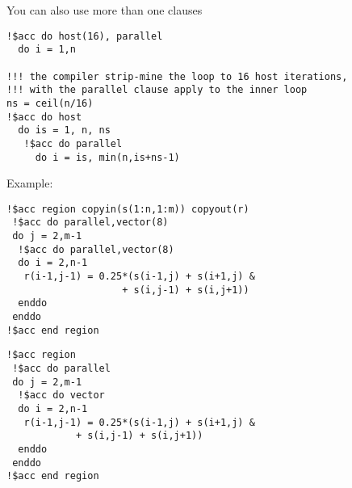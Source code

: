 You can also use more than one clauses
\begin{lstlisting}
!$acc do host(16), parallel 
  do i = 1,n

!!! the compiler strip-mine the loop to 16 host iterations, 
!!! with the parallel clause apply to the inner loop
ns = ceil(n/16) 
!$acc do host 
  do is = 1, n, ns 
   !$acc do parallel 
     do i = is, min(n,is+ns-1)
\end{lstlisting}

Example:
\begin{lstlisting}
!$acc region copyin(s(1:n,1:m)) copyout(r)
 !$acc do parallel,vector(8)
 do j = 2,m-1
  !$acc do parallel,vector(8)
  do i = 2,n-1
   r(i-1,j-1) = 0.25*(s(i-1,j) + s(i+1,j) & 
                    + s(i,j-1) + s(i,j+1))
  enddo
 enddo
!$acc end region
\end{lstlisting}

\begin{lstlisting}
!$acc region
 !$acc do parallel
 do j = 2,m-1
  !$acc do vector
  do i = 2,n-1
   r(i-1,j-1) = 0.25*(s(i-1,j) + s(i+1,j) &
            + s(i,j-1) + s(i,j+1))
  enddo
 enddo
!$acc end region
\end{lstlisting}






